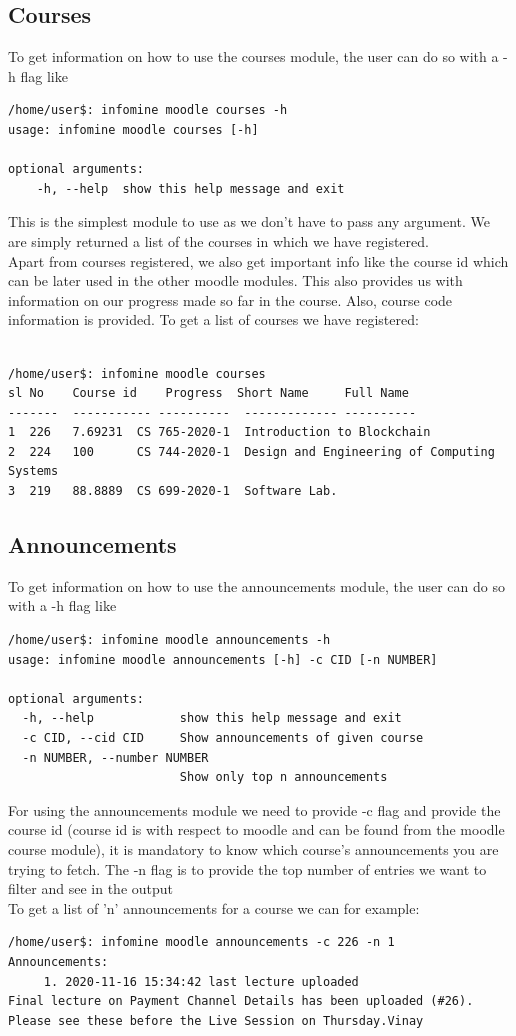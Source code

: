 \documentclass[12pt, a4paper]{article}
\begin{document}
\subsection{Courses}
To get information on how to use the courses module, the user can do so with a -h flag like 
\begin{verbatim}
/home/user$: infomine moodle courses -h
usage: infomine moodle courses [-h]

optional arguments:
    -h, --help  show this help message and exit
\end{verbatim}
This is the simplest module to use as we don't have to pass any argument. We are simply returned a list of the courses in which we have registered.\\
Apart from courses registered, we also get important info like the course id which can be later used in the other moodle modules.
This also provides us with information on our progress made so far in the course.
Also, course code information is provided.
To get a list of courses we have registered:\\
\\
\begin{verbatim}
/home/user$: infomine moodle courses
sl No    Course id    Progress  Short Name     Full Name
-------  ----------- ----------  ------------- ----------
1  226   7.69231  CS 765-2020-1  Introduction to Blockchain
2  224   100      CS 744-2020-1  Design and Engineering of Computing Systems
3  219   88.8889  CS 699-2020-1  Software Lab.
\end{verbatim}

\subsection{Announcements}
To get information on how to use the announcements module, the user can do so with a -h flag like 
\begin{verbatim}
/home/user$: infomine moodle announcements -h
usage: infomine moodle announcements [-h] -c CID [-n NUMBER]

optional arguments:
  -h, --help            show this help message and exit
  -c CID, --cid CID     Show announcements of given course
  -n NUMBER, --number NUMBER
                        Show only top n announcements
\end{verbatim}
For using the announcements module we need to provide -c flag and provide the course id (course id is with respect to moodle and can be found from the moodle course module), it is mandatory to know which course's announcements you are trying to fetch. The -n flag is to provide the top number of entries we want to filter and see in the output\\
To get a list of 'n' announcements for a course we can for example:
\begin{verbatim}
/home/user$: infomine moodle announcements -c 226 -n 1
Announcements:
	 1. 2020-11-16 15:34:42 last lecture uploaded
Final lecture on Payment Channel Details has been uploaded (#26). 
Please see these before the Live Session on Thursday.Vinay
\end{verbatim}
\end{document}
